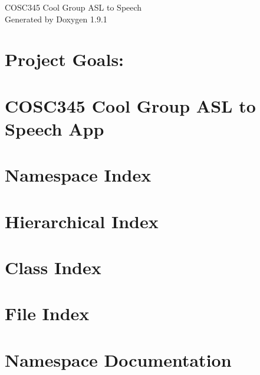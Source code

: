 \let\mypdfximage\pdfximage\def\pdfximage{\immediate\mypdfximage}\documentclass[twoside]{book}
\newcommand{\+}{\discretionary{\mbox{\scriptsize$\hookleftarrow$}}{}{}}
\newcommand{\clearemptydoublepage}{%
  \newpage{\pagestyle{empty}\cleardoublepage}%
}
\begin{document}
\raggedbottom

\hypersetup{pageanchor=false,
             bookmarksnumbered=true,
             pdfencoding=unicode
            }
\begin{titlepage}
\vspace*{7cm}
\begin{center}%
{\Large COSC345 Cool Group ASL to Speech }\\
\vspace*{1cm}
{\large Generated by Doxygen 1.9.1}\\
\end{center}
\end{titlepage}
\clearemptydoublepage
{}
\tableofcontents
\clearemptydoublepage
{}
\hypersetup{pageanchor=true}

\chapter{Project Goals\+:}
\label{index}\hypertarget{index}{}
\chapter{COSC345 Cool Group ASL to Speech App}
\label{md__r_e_a_d_m_e}

\chapter{Namespace Index}

\chapter{Hierarchical Index}

\chapter{Class Index}

\chapter{File Index}

\chapter{Namespace Documentation}
















\end{document}
